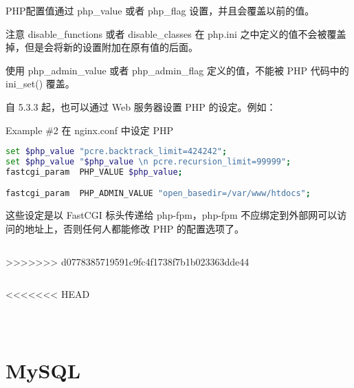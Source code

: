 PHP配置值通过 php\_value 或者 php\_flag 设置，并且会覆盖以前的值。

注意 disable\_functions 或者 disable\_classes 在 php.ini 之中定义的值不会被覆盖掉，但是会将新的设置附加在原有值的后面。

使用 php\_admin\_value 或者 php\_admin\_flag 定义的值，不能被 PHP 代码中的 ini\_set() 覆盖。

自 5.3.3 起，也可以通过 Web 服务器设置 PHP 的设定。例如：

Example \#2 在 nginx.conf 中设定 PHP

\begin{lstlisting}[language=bash]
set $php_value "pcre.backtrack_limit=424242";
set $php_value "$php_value \n pcre.recursion_limit=99999";
fastcgi_param  PHP_VALUE $php_value;

fastcgi_param  PHP_ADMIN_VALUE "open_basedir=/var/www/htdocs";
\end{lstlisting}


这些设定是以 FastCGI 标头传递给 php-fpm，php-fpm 不应绑定到外部网可以访问的地址上，否则任何人都能修改 PHP 的配置选项了。

\begin{lstlisting}[language=bash]

\end{lstlisting}

>>>>>>> d0778385719591c9fc4f1738f7b1b023363dde44



\begin{lstlisting}[language=bash]

\end{lstlisting}




<<<<<<< HEAD
\begin{lstlisting}[language=bash]

\end{lstlisting}




\begin{lstlisting}[language=bash]

\end{lstlisting}




\begin{lstlisting}[language=bash]

\end{lstlisting}




\section{MySQL}








